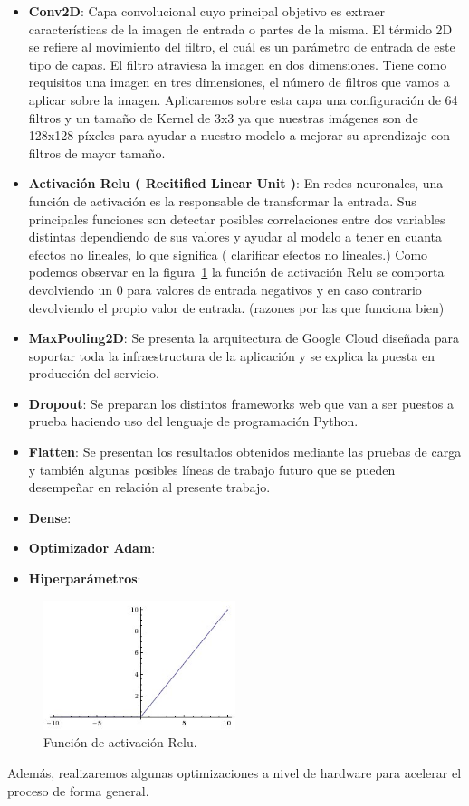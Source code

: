 \begin{itemize}
    \item \textbf{Conv2D}: Capa convolucional cuyo principal objetivo es extraer características de la imagen de entrada o partes de la misma.
    El térmido 2D se refiere al movimiento del filtro, el cuál es un parámetro de entrada de este tipo de capas.
    El filtro atraviesa la imagen en dos dimensiones.
    Tiene como requisitos una imagen en tres dimensiones, el número de filtros que vamos a aplicar sobre la imagen.
    Aplicaremos sobre esta capa una configuración de 64 filtros y un tamaño de Kernel de 3x3 ya que nuestras imágenes son de 128x128 píxeles para ayudar a nuestro modelo a mejorar su aprendizaje con filtros de mayor tamaño.
    \item \textbf{Activación Relu ( Recitified Linear Unit )}: En redes neuronales, una función de activación es la responsable de transformar la entrada. Sus principales funciones son detectar posibles correlaciones entre dos variables distintas dependiendo de sus valores y ayudar al modelo a tener en cuanta efectos no lineales, lo que significa ( clarificar efectos no lineales.)
    Como podemos observar en la figura~\ref{fig:Función de activación Relu} la función de activación Relu se comporta devolviendo un 0 para valores de entrada negativos y en caso contrario devolviendo el propio valor de entrada. (razones por las que funciona bien)
    \item \textbf{MaxPooling2D}: Se presenta la arquitectura de Google Cloud diseñada para soportar toda la infraestructura de la aplicación y se explica la puesta en producción del servicio.
    \item \textbf{Dropout}: Se preparan los distintos frameworks web que van a ser puestos a prueba haciendo uso del lenguaje de programación Python.
    \item \textbf{Flatten}: Se presentan los resultados obtenidos mediante las pruebas de carga y también algunas posibles líneas de trabajo futuro que se pueden desempeñar en relación al presente trabajo.
    \item \textbf{Dense}:
    \item \textbf{Optimizador Adam}:
    \item \textbf{Hiperparámetros}:
\end{itemize}


\begin{figure}
    \centering
    \includegraphics[width=0.5\textwidth]{images/chapter2/relu.jpg}
    \caption{Función de activación Relu.}
    \label{fig:Función de activación Relu}
\end{figure}
Además, realizaremos algunas optimizaciones a nivel de hardware para acelerar el proceso de forma general.

